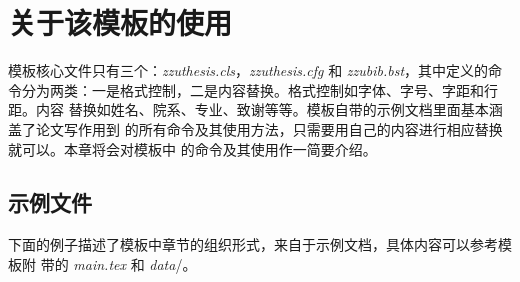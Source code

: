 \chapter{关于该模板的使用}
\label{cha:usage}

模板核心文件只有三个：\emph{zzuthesis.cls}，\emph{zzuthesis.cfg} 和
\emph{zzubib.bst}，其中定义的命
令分为两类：一是格式控制，二是内容替换。格式控制如字体、字号、字距和行距。内容
替换如姓名、院系、专业、致谢等等。模板自带的示例文档里面基本涵盖了论文写作用到
的所有命令及其使用方法，只需要用自己的内容进行相应替换就可以。本章将会对模板中
的命令及其使用作一简要介绍。

\section{\zzuthesis{} 示例文件}

下面的例子描述了模板中章节的组织形式，来自于示例文档，具体内容可以参考模板附
带的 \emph{main.tex} 和 \emph{data}\//。
\begin{code}

\frontmatter
\makecover


\tableofcontents%
\listoffigures%
\listoftables%
\end{code}
\begin{code}
\mainmatter


\end{code}
\begin{code}
\backmatter




\begin{appendix}%
  
  
\end{appendix}



\end{code}


